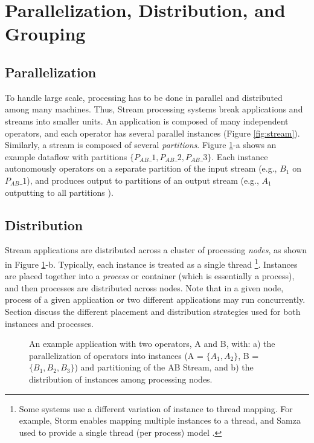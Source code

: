 \section{Parallelization, Distribution, and Grouping}
\label{sec:parallelization}

\subsection{Parallelization}
 To handle large scale, processing has to be done in parallel and distributed among many machines. Thus, Stream processing systems break applications and streams into smaller units. An application is composed of many independent operators, and each operator has several parallel instances (Figure \ref{fig:stream}). Similarly, a stream is composed of several \textit{partitions}. Figure \ref{fig:parallelization}-a shows an example dataflow with partitions $\{P_{AB}\_1, P_{AB}\_2, P_{AB}\_3\}$. 
Each instance autonomously operators on a separate partition of the input stream (e.g., $B_1$ on $P_{AB}\_1$), and produces output to partitions of an output stream (e.g., $A_1$ outputting to all partitions ). 

\subsection{Distribution}
Stream applications are distributed across a cluster of processing \textit{nodes}, as shown in Figure \ref{fig:parallelization}-b. Typically, each instance is treated as a single thread \footnote{Some systems use a different variation of instance to thread mapping. For example, Storm enables mapping multiple instances to a thread, and Samza used to provide a single thread (per process) model .}. 
Instances are placed together into a \textit{process} or container (which is essentially a process), and then processes are distributed across nodes. Note that in a given node, process of a given application or two different applications may run concurrently. 
Section  discuss the different placement and distribution strategies used for both instances and processes. 
	
\begin{figure}[t]
	\centering
	\hspace*{1cm}
	\caption{An example application with two operators, A and B, with: a) the parallelization of operators into instances (A = $\{A_1, A_2\}$, B =$\{B_1, B_2, B_3\}$) and partitioning of the AB Stream, and b) the distribution of instances among processing nodes.}
\label{fig:parallelization}
	
\end{figure}


